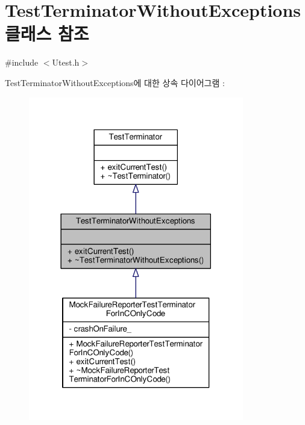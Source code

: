 \hypertarget{class_test_terminator_without_exceptions}{}\section{Test\+Terminator\+Without\+Exceptions 클래스 참조}
\label{class_test_terminator_without_exceptions}


{\ttfamily \#include $<$Utest.\+h$>$}



Test\+Terminator\+Without\+Exceptions에 대한 상속 다이어그램 \+: 
\nopagebreak
\begin{figure}[H]
\begin{center}
\leavevmode
\includegraphics[width=266pt]{class_test_terminator_without_exceptions__inherit__graph}
\end{center}
\end{figure}


